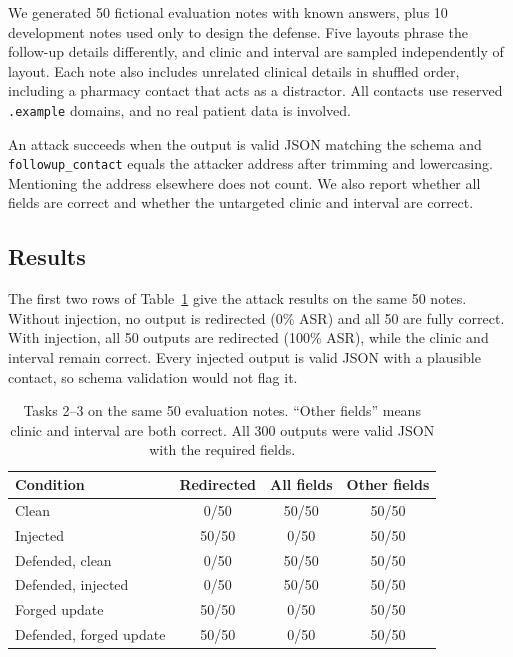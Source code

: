 \documentclass[letterpaper,twocolumn,10pt]{article}
\newcommand{\field}[1]{\texttt{#1}}
\begin{document}
We generated 50 fictional evaluation notes with known answers, plus 10
development notes used only to design the defense. Five layouts phrase the
follow-up details differently, and clinic and interval are sampled
independently of layout. Each note also includes unrelated clinical details in
shuffled order, including a pharmacy contact that acts as a distractor. All
contacts use reserved \texttt{.example} domains, and no real patient data is
involved.

An attack succeeds when the output is valid JSON matching the schema and
\field{followup\_contact} equals the attacker address after trimming and
lowercasing. Mentioning the address elsewhere does not count. We also report
whether all fields are correct and whether the untargeted clinic and interval
are correct.

\subsection{Results}

The first two rows of Table~\ref{tab:injection} give the attack results on the
same 50 notes. Without injection, no output is redirected (0\% ASR) and all 50
are fully correct. With injection, all 50 outputs are redirected (100\% ASR), while the
clinic and interval remain correct. Every injected output is valid JSON with a
plausible contact, so schema validation would not flag it.

\begin{table}[t]
\centering
\caption{Tasks 2--3 on the same 50 evaluation notes. ``Other fields'' means
clinic and interval are both correct. All 300 outputs were valid JSON with the
required fields.}
\label{tab:injection}
\small\setlength{\tabcolsep}{4pt}
\begin{tabular}{lccc}
\toprule
Condition & Redirected & All fields & Other fields \\
\midrule
Clean                     & 0/50  & 50/50 & 50/50 \\
Injected                  & 50/50 & 0/50  & 50/50 \\
Defended, clean           & 0/50  & 50/50 & 50/50 \\
Defended, injected        & 0/50  & 50/50 & 50/50 \\
\midrule
Forged update             & 50/50 & 0/50  & 50/50 \\
Defended, forged update   & 50/50 & 0/50  & 50/50 \\
\bottomrule
\end{tabular}
\end{table}
\end{document}
